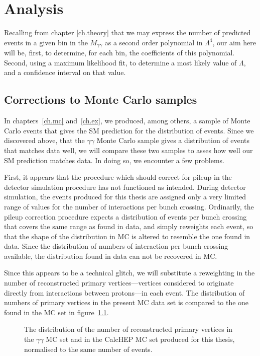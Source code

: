 \chapter{Analysis}\label{ch.an}

Recalling from chapter \ref{ch.theory} that we may express the number of predicted events in a given bin in the $M_{\gamma\gamma}$ as a second order polynomial in $\Lambda^4$, our aim here will be, first, to determine, for each bin, the coefficients of this polynomial. Second, using a maximum likelihood fit, to determine a most likely value of $\Lambda$, and a confidence interval on that value.

\section{Corrections to Monte Carlo samples}

In chapters~\ref{ch.mc} and~\ref{ch.ex}, we produced, among others, a sample of Monte Carlo events that gives the SM prediction for the distribution of events. Since we discovered above, that the \atlas{} $\gamma\gamma$ Monte Carlo sample gives a distribution of events that matches data well, we will compare these two samples to asses how well our SM prediction matches data. In doing so, we encounter a few problems.

First, it appears that the procedure which should correct for pileup in the detector simulation procedure has not functioned as intended. During detector simulation, the events produced for this thesis are assigned only a very limited range of values for the number of interactions per bunch crossing. Ordinarily, the pileup correction procedure expects a distribution of events per bunch crossing that covers the same range as found in data, and simply reweights each event, so that the shape of the distribution in MC is altered to resemble the one found in data. Since the distribution of numbers of interaction per bunch crossing available, the distribution found in data can not be recovered in MC.

Since this appears to be a technical glitch, we will substitute a reweighting in the number of reconstructed primary vertices---vertices considered to originate directly from interactions between protons---in each event. The distribution of numbers of primary vertices in the present MC data set is compared to the one found in the \atlas{} MC set in figure~\ref{pvnnone}.

\begin{figure}[htp]
\begin{minipage}[b]{.69\textwidth}
\begin{infilsf} \tiny

\end{infilsf}
\end{minipage}
\begin{minipage}[b]{.3\textwidth}
\caption{The distribution of the number of reconstructed primary vertices in the \atlas{} $\gamma\gamma$ MC set and in the CalcHEP MC set produced for this thesis, normalised to the same number of events.}\label{pvnnone}
\end{minipage}
\end{figure}


